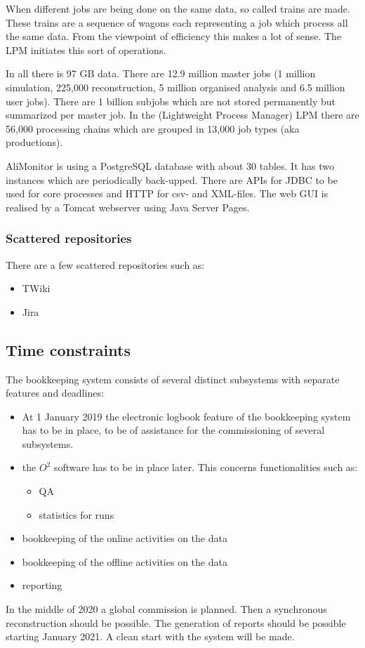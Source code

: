 When different jobs are being done on the same data, so called trains are made. These trains are a sequence of wagons each representing a job which process all the same data. From the viewpoint of efficiency this makes a lot of sense. The LPM initiates this sort of operations.

In all there is 97 GB data. There are 12.9 million master jobs (1 million simulation, 225,000 reconstruction, 5 million organised analysis and 6.5 million user jobs). There are 1 billion subjobs which are not stored permanently but summarized per master job. In the (Lightweight Process Manager) LPM there are 56,000 processing chains which are grouped in 13,000 job types (aka productions).

AliMonitor is using a PostgreSQL database with about 30 tables. It has two instances which are periodically back-upped. There are APIs for JDBC to be used for core processes and HTTP for csv- and XML-files. The web GUI is realised by a Tomcat webserver using Java Server Pages.

\subsubsection{Scattered repositories}
There are a few scattered repositories such as:
\begin{itemize}
  \item TWiki
  \item Jira
  
\end{itemize}

\subsection{Time constraints}

The bookkeeping system consists of several distinct subsystems with separate features and deadlines:
\begin{itemize}
  \item At 1 January 2019 the electronic logbook feature of the bookkeeping system has to be in place, to be of assistance for the commissioning of several subsystems. 
  \item the $O^2$ software has to be in place later. This concerns functionalities such as:
  \begin{itemize}
    \item QA
    \item statistics for runs
  \end{itemize}
  \item bookkeeping of the online activities on the data
  \item bookkeeping of the offline activities on the data
  \item reporting
\end{itemize}
In the middle of 2020 a global commission is planned. Then a synchronous reconstruction should be possible. The generation of reports should be possible starting January 2021. A clean start with the system will be made.

